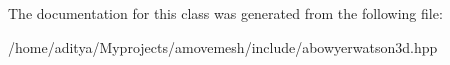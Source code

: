 The documentation for this class was generated from the following file\-:\begin{DoxyCompactItemize}
\item 
/home/aditya/\-Myprojects/amovemesh/include/abowyerwatson3d.\-hpp\end{DoxyCompactItemize}
